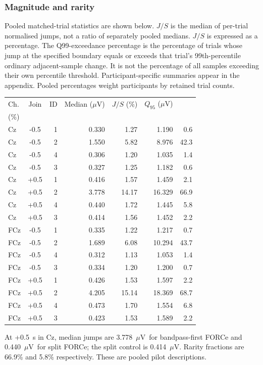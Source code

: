 \documentclass[11pt,a4paper]{article}
\newcommand{\uv}{\ensuremath{\mu\mathrm{V}}}
\begin{document}
\subsubsection{Magnitude and rarity}
Pooled matched-trial statistics are shown below. $J/S$ is the median of per-trial normalised jumps, not a ratio of separately pooled medians. $J/S$ is expressed as a percentage. The Q99-exceedance percentage is the percentage of trials whose jump at the specified boundary equals or exceeds that trial's 99th-percentile ordinary adjacent-sample change. It is not the percentage of all samples exceeding their own percentile threshold. Participant-specific summaries appear in the appendix. Pooled percentages weight participants by retained trial counts.
\begin{center}\small\begin{tabular}{lcrrrrr}\toprule
Ch. & Join & ID & Median (\uv) & $J/S$ (\%) & $Q_{95}$ (\uv) & \shortstack{Trials $\geq Q_{99}$\\(\%)} \\
\midrule
Cz & -0.5 & 1 & 0.330 & 1.27 & 1.190 & 0.6 \\
Cz & -0.5 & 2 & 1.550 & 5.82 & 8.976 & 42.3 \\
Cz & -0.5 & 4 & 0.306 & 1.20 & 1.035 & 1.4 \\
Cz & -0.5 & 3 & 0.327 & 1.25 & 1.182 & 0.6 \\
Cz & +0.5 & 1 & 0.416 & 1.57 & 1.459 & 2.1 \\
Cz & +0.5 & 2 & 3.778 & 14.17 & 16.329 & 66.9 \\
Cz & +0.5 & 4 & 0.440 & 1.72 & 1.445 & 5.8 \\
Cz & +0.5 & 3 & 0.414 & 1.56 & 1.452 & 2.2 \\
FCz & -0.5 & 1 & 0.335 & 1.22 & 1.217 & 0.7 \\
FCz & -0.5 & 2 & 1.689 & 6.08 & 10.294 & 43.7 \\
FCz & -0.5 & 4 & 0.312 & 1.13 & 1.053 & 1.4 \\
FCz & -0.5 & 3 & 0.334 & 1.20 & 1.200 & 0.7 \\
FCz & +0.5 & 1 & 0.426 & 1.53 & 1.597 & 2.2 \\
FCz & +0.5 & 2 & 4.205 & 15.14 & 18.369 & 68.7 \\
FCz & +0.5 & 4 & 0.473 & 1.70 & 1.554 & 6.8 \\
FCz & +0.5 & 3 & 0.423 & 1.53 & 1.589 & 2.2 \\
\bottomrule\end{tabular}\end{center}
At +0.5~s in Cz, median jumps are 3.778~\uv\ for bandpass-first FORCe and 0.440~\uv\ for split FORCe; the split control is 0.414~\uv. Rarity fractions are 66.9\% and 5.8\% respectively. These are pooled pilot descriptions.
\end{document}
